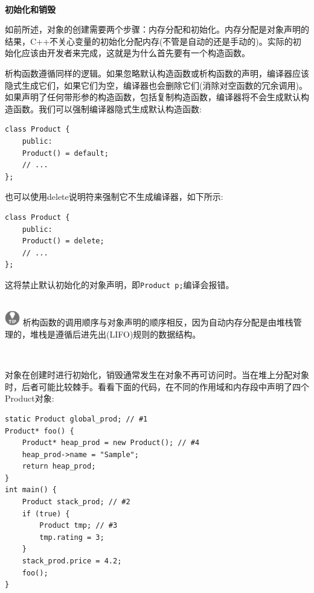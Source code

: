 \noindent\textbf{}\ \par
\textbf{初始化和销毁} \ \par
如前所述，对象的创建需要两个步骤：内存分配和初始化。内存分配是对象声明的结果，C++不关心变量的初始化分配内存(不管是自动的还是手动的)。实际的初始化应该由开发者来完成，这就是为什么首先要有一个构造函数。 \par
析构函数遵循同样的逻辑。如果忽略默认构造函数或析构函数的声明，编译器应该隐式生成它们，如果它们为空，编译器也会删除它们(消除对空函数的冗余调用)。如果声明了任何带形参的构造函数，包括复制构造函数，编译器将不会生成默认构造函数。我们可以强制编译器隐式生成默认构造函数: \par

\begin{lstlisting}[caption={}]
class Product {
	public:
	Product() = default;
	// ...
};
\end{lstlisting}

也可以使用delete说明符来强制它不生成编译器，如下所示:\par

\begin{lstlisting}[caption={}]
class Product {
	public:
	Product() = delete;
	// ...
};
\end{lstlisting}

这将禁止默认初始化的对象声明，即\texttt{Product p;}编译会报错。 \par

\hspace*{\fill} \\ %
\includegraphics[width=0.05\textwidth]{images/tip}
析构函数的调用顺序与对象声明的顺序相反，因为自动内存分配是由堆栈管理的，堆栈是遵循后进先出(LIFO)规则的数据结构。 \par
\noindent\textbf{}\ \par

对象在创建时进行初始化，销毁通常发生在对象不再可访问时。当在堆上分配对象时，后者可能比较棘手。看看下面的代码，在不同的作用域和内存段中声明了四个Product对象: \par

\begin{lstlisting}[caption={}]
static Product global_prod; // #1
Product* foo() {
	Product* heap_prod = new Product(); // #4
	heap_prod->name = "Sample";
	return heap_prod;
}
int main() {
	Product stack_prod; // #2
	if (true) {
		Product tmp; // #3
		tmp.rating = 3;
	}
	stack_prod.price = 4.2;
	foo();
}
\end{lstlisting}

